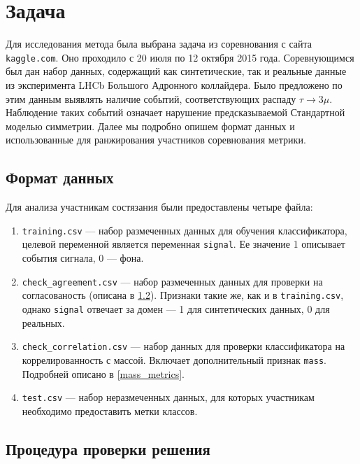 \documentclass[14pt]{extarticle}
\begin{document}
\newpage
\section{Задача}

Для исследования метода была выбрана задача из соревнования \cite{kaggle_contest} с сайта \texttt{kaggle.com}. Оно проходило с 20 июля по 12 октября 2015 года. Соревнующимся был дан набор данных, содержащий как синтетические, так и реальные данные из эксперимента LHCb Большого Адронного коллайдера. Было предложено по этим данным выявлять наличие событий, соответствующих распаду $\tau \rightarrow 3\mu$. Наблюдение таких событий означает нарушение предсказываемой Стандартной моделью симметрии.
Далее мы подробно опишем формат данных и использованные для ранжирования участников соревнования метрики.  

\subsection{Формат данных}
Для анализа участникам состязания были предоставлены четыре файла:
\begin{enumerate}
\item \texttt{training.csv} — набор размеченных данных для обучения классификатора, целевой переменной является переменная \texttt{signal}. Ее значение 1 описывает события сигнала, 0 — фона.
\item \texttt{check\_agreement.csv} — набор размеченных данных для проверки на согласованость (описана в \ref{agreement_metrics}). Признаки такие же, как и в \texttt{training.csv}, однако \texttt{signal} отвечает за домен — 1 для синтетических данных, 0 для реальных.
\item \texttt{check\_correlation.csv} — набор данных для проверки классификатора на коррелированность с массой. Включает дополнительный признак \texttt{mass}. Подробней описано в \ref{mass_metrics}.
\item \texttt{test.csv} — набор неразмеченных данных, для которых участникам необходимо предоставить метки классов.
\end{enumerate}

\subsection{Процедура проверки решения}

\label{agreement_metrics}
\end{document}
